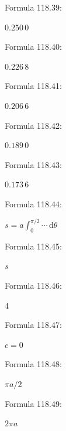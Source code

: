 \documentclass[11pt]{article}
\begin{document}
\noindent Formula 118.39:\par
$0.250\,0$\par
\noindent Formula 118.40:\par
$0.226\,8$\par
\noindent Formula 118.41:\par
$0.206\,6$\par
\noindent Formula 118.42:\par
$0.189\,0$\par
\noindent Formula 118.43:\par
$0.173\,6$\par
\noindent Formula 118.44:\par
$s=a\int_0^{\pi/2}\cdots\,\mathrm{d}\theta$\par
\noindent Formula 118.45:\par
$s$\par
\noindent Formula 118.46:\par
$4$\par
\noindent Formula 118.47:\par
$c=0$\par
\noindent Formula 118.48:\par
$\pi a/2$\par
\noindent Formula 118.49:\par
$2\pi a$\par
\end{document}
